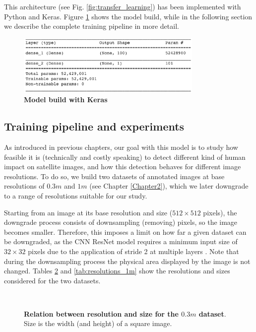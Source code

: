 This architecture (see Fig. \ref{fig:transfer_learning}) has been implemented with Python and Keras. Figure \ref{fig:model_keras} shows the model build, while in the following section we describe the complete training pipeline in more detail.

\begin{figure}[h!]
	\centering
	\includegraphics[width=0.8\textwidth]{Figures/model_keras.png}
	\captionsetup{width=1\linewidth}
	\caption{\textbf{Model build with Keras}}
	\label{fig:model_keras}
\end{figure}


\subsection{Training pipeline and experiments}

As introduced in previous chapters, our goal with this model is to study how feasible it is (technically and costly speaking) to detect different kind of human impact on satellite images, and how this detection behaves for different image resolutions. To do so, we build two datasets of annotated images at base resolutions of $0.3m$ and $1m$ (see Chapter \ref{Chapter2}), which we later downgrade to a range of resolutions suitable for our study.

Starting from an image at its base resolution and size ($512\times512$ pixels), the downgrade process consists of downsampling (removing) pixels, so the image becomes smaller. Therefore, this imposes a limit on how far a given dataset can be downgraded, as the CNN ResNet model requires a minimum input size of $32\times32$ pixels due to the application of stride 2 at multiple layers \parencite{ResNetKeras}. Note that during the downsampling process the physical area displayed by the image is not changed. Tables \ref{tab:resolutions_03m} and \ref{tab:resolutions_1m} show the resolutions and sizes considered for the two datasets.

\

\begin{figure}[H]
	\centering
	
	\captionsetup{width=1\linewidth}
	\caption{\textbf{Relation between resolution and size for the $0.3m$ dataset}. Size is the width (and height) of a square image.}
	\label{tab:resolutions_03m}
\end{figure}

